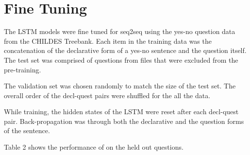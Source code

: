 \documentclass{article}
\begin{document}
\begin{table}[h!]
\centering
{}
\caption{Model Parameters}
\label{tab:model_parameters}
\end{table}

\section{Fine Tuning}
The LSTM models were fine tuned for seq2seq using the yes-no question data from the CHILDES Treebank. Each item in the training data was the concatenation of the declarative form of a yes-no sentence and the question itself. The test set was comprised of questions from files that were excluded from the pre-training.

The validation set was chosen randomly to match the size of the test set. The overall order of the decl-quest pairs were shuffled for the all the data. 

While training, the hidden states of the LSTM were reset after each decl-quest pair. Back-propagation was through both the declarative and the question forms of the sentence.

Table 2 shows the performance of on the held out questions. 
\end{document}
